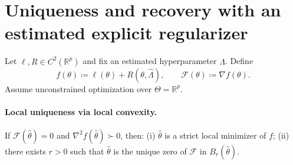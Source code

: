 \documentclass[10pt]{article}
\begin{document}








\newpage




\newpage
\appendix

\section{Uniqueness and recovery with an estimated explicit regularizer}
\label{app:unique-weights}

Let $\ell, R \in C^2(\mathbb{R}^p)$ and fix an estimated hyperparameter $\hat\Lambda$.
Define
\[
f(\theta) \coloneqq \ell(\theta) + R(\theta,\hat\Lambda),
\qquad
\mathcal{F}(\theta) \coloneqq \nabla f(\theta).
\]
Assume unconstrained optimization over $\Theta=\mathbb{R}^p$.

\paragraph{Local uniqueness via local convexity.}
\begin{proposition}
\label{prop:local}
If $\mathcal{F}(\hat\theta)=0$ and $\nabla^2 f(\hat\theta)\succ0$, then:
(i) $\hat\theta$ is a strict local minimizer of $f$; 
(ii) there exists $r>0$ such that $\hat\theta$ is the unique zero of $\mathcal{F}$ in $B_r(\hat\theta)$.
\end{proposition}
\end{document}
